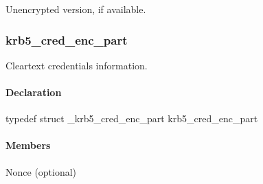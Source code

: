 \documentclass[letterpaper,10pt,english]{sphinxmanual}
\begin{document}

\begin{fulllineitems}
\label{appdev/refs/types/krb5_cred:krb5_cred.enc_part2}
Unencrypted version, if available.

\end{fulllineitems}



\subsubsection{krb5\_cred\_enc\_part}
\label{appdev/refs/types/krb5_cred_enc_part::doc}\label{appdev/refs/types/krb5_cred_enc_part:krb5-cred-enc-part}\label{appdev/refs/types/krb5_cred_enc_part:krb5-cred-enc-part-struct}

\begin{fulllineitems}
\label{appdev/refs/types/krb5_cred_enc_part:krb5_cred_enc_part}
\end{fulllineitems}


Cleartext credentials information.


\paragraph{Declaration}
\label{appdev/refs/types/krb5_cred_enc_part:declaration}
typedef struct \_krb5\_cred\_enc\_part  krb5\_cred\_enc\_part


\paragraph{Members}
\label{appdev/refs/types/krb5_cred_enc_part:members}

\begin{fulllineitems}
\label{appdev/refs/types/krb5_cred_enc_part:krb5_cred_enc_part.magic}
\end{fulllineitems}


\begin{fulllineitems}
\label{appdev/refs/types/krb5_cred_enc_part:krb5_cred_enc_part.nonce}
Nonce (optional)

\end{fulllineitems}
\end{document}
